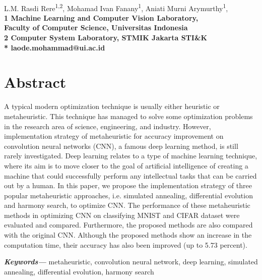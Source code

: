 \documentclass[10pt,letterpaper]{article}
\begin{document}
\vspace*{0.35in}


\begin{flushleft}{\Large
\textbf{}
}
\newline
\\
L.M. Rasdi Rere\textsuperscript{1,2},
Mohamad Ivan Fanany\textsuperscript{1},
Aniati Murni Arymurthy\textsuperscript{1},
\\
\bigskip
\bf{1} Machine Learning and Computer Vision Laboratory, \\Faculty of Computer Science, Universitas Indonesia\\
\bf{2} Computer System Laboratory, STMIK Jakarta STI\&K\\
\bigskip
* laode.mohammad@ui.ac.id

\end{flushleft}

\providecommand{\keywords}[1]{\textbf{\textit{Keywords---}} #1}

\section*{Abstract}
A typical modern optimization technique is usually either heuristic or metaheuristic. This technique has managed to solve some optimization problems in the research area of science, engineering, and industry. However, implementation strategy of metaheuristic for accuracy improvement on convolution neural networks (CNN), a famous deep learning method, is still rarely investigated.  Deep learning relates to a type of machine learning technique, where its aim is to move closer to the goal of artificial intelligence of creating a machine that could successfully perform any intellectual tasks that can be carried out by a human. In this paper, we propose the implementation strategy of three popular metaheuristic approaches, i.e. simulated annealing, differential evolution and harmony search, to optimize CNN. The performance of these metaheuristic methods in optimizing CNN on classifying MNIST and CIFAR dataset were evaluated and compared. Furthermore, the proposed methods are also compared with the original CNN. Although the proposed methods show an increase in the computation time, their accuracy has also been improved (up to 5.73 percent).
\bigskip

\noindent\keywords{metaheuristic, convolution neural network, deep learning, simulated annealing, differential evolution, harmony search}
\end{document}
